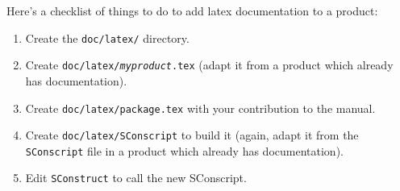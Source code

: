 Here's a checklist of things to do to add latex documentation to a product:

\begin{enumerate}
  \item Create the \texttt{doc/latex/} directory.
  \item Create \texttt{doc/latex/{\itshape myproduct}.tex} (adapt it
    from a product which already has documentation).
  \item Create \texttt{doc/latex/package.tex} with your contribution to the manual.
  \item Create \texttt{doc/latex/SConscript} to build it (again, adapt
    it from the \texttt{SConscript} file in a product which already
    has documentation).
  \item Edit \texttt{SConstruct} to call the new SConscript.
\end{enumerate}

